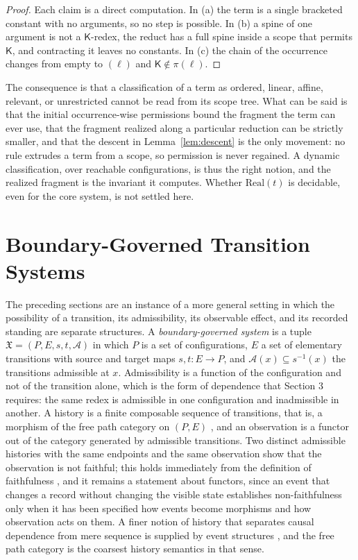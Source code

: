 \documentclass[11pt]{article}
\theoremstyle{definition}
\theoremstyle{remark}
\newcommand{\cK}{\mathsf{K}}
\newcommand{\Real}{\mathrm{Real}}
\begin{document}
\begin{proof}
Each claim is a direct computation. In (a) the term is a single bracketed constant with no arguments, so no step is possible. In (b) a spine of one argument is not a $\cK$-redex, the reduct has a full spine inside a scope that permits $\cK$, and contracting it leaves no constants. In (c) the chain of the occurrence changes from empty to $(\ell)$ and $\cK\notin\pi(\ell)$.
\end{proof}

The consequence is that a classification of a term as ordered, linear, affine, relevant, or unrestricted cannot be read from its scope tree. What can be said is that the initial occurrence-wise permissions bound the fragment the term can ever use, that the fragment realized along a particular reduction can be strictly smaller, and that the descent in Lemma~\ref{lem:descent} is the only movement: no rule extrudes a term from a scope, so permission is never regained. A dynamic classification, over reachable configurations, is thus the right notion, and the realized fragment is the invariant it computes. Whether $\Real(t)$ is decidable, even for the core system, is not settled here.

\section{Boundary-Governed Transition Systems}

The preceding sections are an instance of a more general setting in which the possibility of a transition, its admissibility, its observable effect, and its recorded standing are separate structures. A \emph{boundary-governed system} is a tuple $\mathfrak X=(P,E,s,t,\mathcal A)$ in which $P$ is a set of configurations, $E$ a set of elementary transitions with source and target maps $s,t:E\to P$, and $\mathcal A(x)\subseteq s^{-1}(x)$ the transitions admissible at $x$. Admissibility is a function of the configuration and not of the transition alone, which is the form of dependence that Section 3 requires: the same redex is admissible in one configuration and inadmissible in another. A history is a finite composable sequence of transitions, that is, a morphism of the free path category on $(P,E)$ \citep[Ch.~II]{maclane1998}, and an observation is a functor out of the category generated by admissible transitions. Two distinct admissible histories with the same endpoints and the same observation show that the observation is not faithful; this holds immediately from the definition of faithfulness \citep[Ch.~I]{maclane1998}, and it remains a statement about functors, since an event that changes a record without changing the visible state establishes non-faithfulness only when it has been specified how events become morphisms and how observation acts on them. A finer notion of history that separates causal dependence from mere sequence is supplied by event structures \citep{winskel1987}, and the free path category is the coarsest history semantics in that sense.
\end{document}
